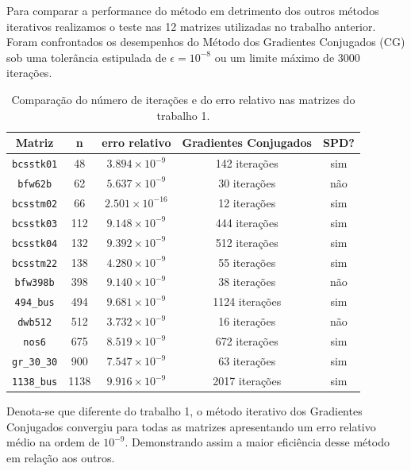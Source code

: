 \documentclass[12pt,a4paper]{article}
\begin{document}
Para comparar a performance do método em detrimento dos outros métodos iterativos realizamos o teste nas 12 matrizes utilizadas no trabalho anterior. Foram confrontados os desempenhos do Método dos Gradientes Conjugados (CG) sob uma tolerância estipulada de $\epsilon = 10^{-8}$ ou um limite máximo de $3000$ iterações. 

\begin{table}[H]
\centering
\caption{Comparação do número de iterações e do erro relativo nas matrizes do trabalho 1.}
\label{tab:comparacao_matrizes}
\vspace{2mm}
\begin{tabular}{ccccc}
\toprule
\textbf{Matriz} & \textbf{n}  & \textbf{erro relativo} & \textbf{Gradientes Conjugados} & \textbf{SPD?} \\
\midrule
\texttt{bcsstk01}& 48  & $3.894 \times 10^{-9}$ & 142 iterações & sim \\
\texttt{bfw62b}& 62  & $5.637 \times 10^{-9}$ & 30 iterações & não\\
\texttt{bcsstm02}& 66  & $2.501\times 10^{-16}$ & 12 iterações & sim \\
\texttt{bcsstk03}& 112  & $9.148 \times 10^{-9}$  & 444 iterações & sim\\
\texttt{bcsstk04}& 132  & $9.392 \times 10^{-9}$ & 512 iterações & sim \\
\texttt{bcsstm22}& 138  & $4.280 \times 10^{-9}$ & 55 iterações & sim \\
\texttt{bfw398b}& 398  & $9.140 \times 10^{-9}$  & 38 iterações & não \\
\texttt{494\_bus}& 494  & $9.681 \times 10^{-9}$ & 1124 iterações & sim \\
\texttt{dwb512}& 512  &  $3.732 \times 10^{-9}$  & 16 iterações & não \\
\texttt{nos6}& 675  & $8.519 \times 10^{-9}$ & 672 iterações & sim\\
\texttt{gr\_30\_30}& 900  & $7.547 \times 10^{-9}$ & 63 iterações & sim \\
\texttt{1138\_bus}& 1138 & $9.916 \times 10^{-9}$ & 2017 iterações & sim \\
\bottomrule
\end{tabular}
\end{table}

Denota-se que diferente do trabalho 1, o método iterativo dos Gradientes Conjugados convergiu para todas as matrizes apresentando um erro relativo médio na ordem de $10^{-9}$. Demonstrando assim a maior eficiência desse método em relação aos outros. 
\end{document}
